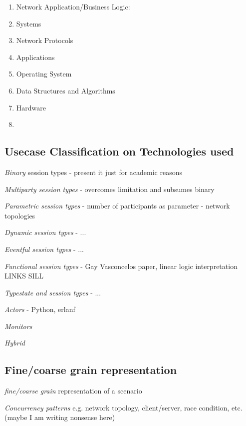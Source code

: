 
\begin{enumerate}
	\item	Network Application/Business Logic:

	\item	Systems

	\item	Network Protocols

	\item	Applications

	\item	Operating System

	\item	Data Structures and Algorithms

	\item	Hardware

	\item	{}
\end{enumerate}


\subsection{Usecase Classification on Technologies used}


{\em Binary} session types - present it just for academic reasons

{\em Multiparty session types} - overcomes limitation and subsumes binary

{\em Parametric session types} - number of participants as parameter - network topologies

{\em Dynamic session types} - ...

{\em Eventful session types} - ...

{\em Functional session types} - Gay Vasconcelos paper, linear logic interpretation LINKS SILL

{\em Typestate and session types} - ...

{\em Actors} - Python, erlanf

{\em Monitors}

{\em Hybrid}

\subsection{Fine/coarse grain representation}
{\em  fine/coarse grain} representation of a scenario

{\em Concurrency patterns} e.g. network topology, client/server, race condition, etc. (maybe I am writing nonsense here)

